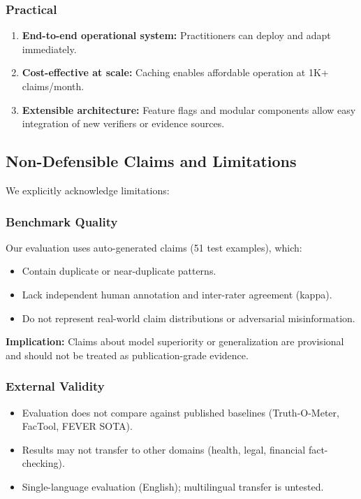 \documentclass[12pt,a4paper,twoside]{article}
\begin{document}
\subsubsection{Practical}

\begin{enumerate}
    \item \textbf{End-to-end operational system:} Practitioners can deploy and adapt immediately.
    \item \textbf{Cost-effective at scale:} Caching enables affordable operation at 1K+ claims/month.
    \item \textbf{Extensible architecture:} Feature flags and modular components allow easy integration of new verifiers or evidence sources.
\end{enumerate}

\subsection{Non-Defensible Claims and Limitations}

We explicitly acknowledge limitations:

\subsubsection{Benchmark Quality}

Our evaluation uses auto-generated claims (51 test examples), which:

\begin{itemize}
    \item Contain duplicate or near-duplicate patterns.
    \item Lack independent human annotation and inter-rater agreement (kappa).
    \item Do not represent real-world claim distributions or adversarial misinformation.
\end{itemize}

\textbf{Implication:} Claims about model superiority or generalization are provisional and should not be treated as publication-grade evidence.

\subsubsection{External Validity}

\begin{itemize}
    \item Evaluation does not compare against published baselines (Truth-O-Meter, FacTool, FEVER SOTA).
    \item Results may not transfer to other domains (health, legal, financial fact-checking).
    \item Single-language evaluation (English); multilingual transfer is untested.
\end{itemize}
\end{document}
